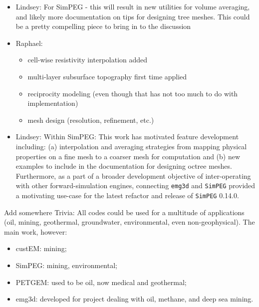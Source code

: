 \documentclass[
    paper,
  ]{geophysics}
\newcommand{\emg}[2]{\texttt{emg#1#2}\xspace}
\newcommand{\simpeg}{\texttt{SimPEG}\xspace}
\begin{document}
\begin{itemize}
    \item Lindsey: For SimPEG - this will result in new utilities for volume averaging, and likely more documentation on tips for designing tree meshes. This could be a pretty compelling piece to bring in to the discussion
    \item Raphael:
    \begin{itemize}
        \item cell-wise resistivity interpolation added
        \item multi-layer subsurface topography first time applied
        \item reciprocity modeling (even though that has not too much to do with implementation)
        \item mesh design (resolution, refinement, etc.)
    \end{itemize}
  \item Lindsey:
    Within SimPEG: This work has motivated feature development including: (a)
    interpolation and averaging strategies from mapping physical properties on
    a fine mesh to a coarser mesh for computation and (b) new examples to
    include in the documentation for designing octree meshes. Furthermore, as a
    part of a broader development objective of inter-operating with other
    forward-simulation engines, connecting \emg3d and \simpeg provided a
    motivating use-case for the latest refactor and release of \simpeg 0.14.0.
\end{itemize}

Add somewhere Trivia: All codes could be used for a multitude of applications (oil, mining, geothermal, groundwater, environmental, even non-geophysical). The main work, however:
\begin{itemize}
    \item custEM: mining;
    \item SimPEG: mining, environmental;
    \item PETGEM: used to be oil, now medical and geothermal;
    \item emg3d: developed for project dealing with oil, methane, and deep sea mining.
\end{itemize}
\end{document}
